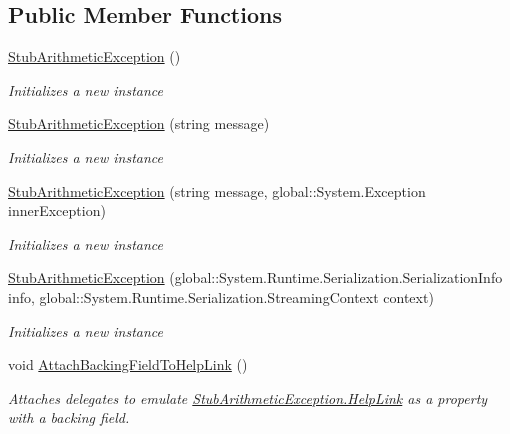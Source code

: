 \subsection*{Public Member Functions}
\begin{DoxyCompactItemize}
\item 
\hyperlink{class_system_1_1_fakes_1_1_stub_arithmetic_exception_a9173f22e9c84558f073b406dabe82765}{Stub\-Arithmetic\-Exception} ()
\begin{DoxyCompactList}\small\item\em Initializes a new instance\end{DoxyCompactList}\item 
\hyperlink{class_system_1_1_fakes_1_1_stub_arithmetic_exception_a355e56be343fcf7f13ee745271b0d461}{Stub\-Arithmetic\-Exception} (string message)
\begin{DoxyCompactList}\small\item\em Initializes a new instance\end{DoxyCompactList}\item 
\hyperlink{class_system_1_1_fakes_1_1_stub_arithmetic_exception_a9ad534e333aed67e1328a71f9a120ff3}{Stub\-Arithmetic\-Exception} (string message, global\-::\-System.\-Exception inner\-Exception)
\begin{DoxyCompactList}\small\item\em Initializes a new instance\end{DoxyCompactList}\item 
\hyperlink{class_system_1_1_fakes_1_1_stub_arithmetic_exception_adae06b906c736ad8b68b6ec94158587c}{Stub\-Arithmetic\-Exception} (global\-::\-System.\-Runtime.\-Serialization.\-Serialization\-Info info, global\-::\-System.\-Runtime.\-Serialization.\-Streaming\-Context context)
\begin{DoxyCompactList}\small\item\em Initializes a new instance\end{DoxyCompactList}\item 
void \hyperlink{class_system_1_1_fakes_1_1_stub_arithmetic_exception_a44b788950d977ca413aec7f0045b59ef}{Attach\-Backing\-Field\-To\-Help\-Link} ()
\begin{DoxyCompactList}\small\item\em Attaches delegates to emulate \hyperlink{class_system_1_1_fakes_1_1_stub_arithmetic_exception_a12cdede74bdd0f27f0ec5affb2b6fe07}{Stub\-Arithmetic\-Exception.\-Help\-Link} as a property with a backing field.\end{DoxyCompactList}\item 

\end{DoxyCompactItemize}
